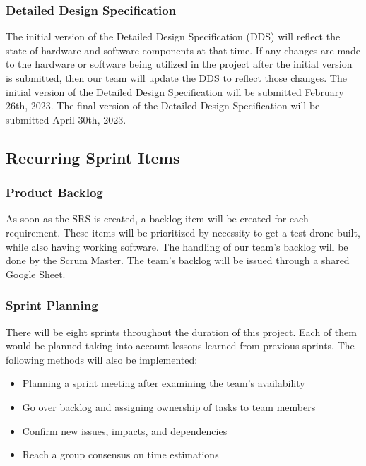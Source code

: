 \subsubsection{Detailed Design Specification}
The initial version of the Detailed Design Specification (DDS) will reflect the state of hardware and software components at that time. If any changes are made to the hardware or software being utilized in the project after the initial version is submitted, then our team will update the DDS to reflect those changes. The initial version of the Detailed Design Specification will be submitted February 26th, 2023. The final version of the Detailed Design Specification will be submitted April 30th, 2023.

\subsection{Recurring Sprint Items}

\subsubsection{Product Backlog}
As soon as the SRS is created, a backlog item will be created for each requirement. These items will be prioritized by necessity to get a test drone built, while also having working software. The handling of our team's backlog will be done by the Scrum Master. The team's backlog will be issued through a shared Google Sheet.

\subsubsection{Sprint Planning}
There will be eight sprints throughout the duration of this project. Each of them would be planned taking into account lessons learned from previous sprints. The following methods will also be implemented:
\begin{itemize}
  \item Planning a sprint meeting after examining the team's availability
  \item Go over backlog and assigning ownership of tasks to team members
  \item Confirm new issues, impacts, and dependencies
  \item Reach a group consensus on time estimations
\end{itemize}

